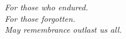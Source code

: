\documentclass[../1_thesis]{subfiles}
\begin{document}

\begin{dedication}
\textit{For those who endured.}\\[1em]
\textit{For those forgotten.}\\[1em]
\textit{May remembrance outlast us all.}
\end{dedication}
\end{document}
